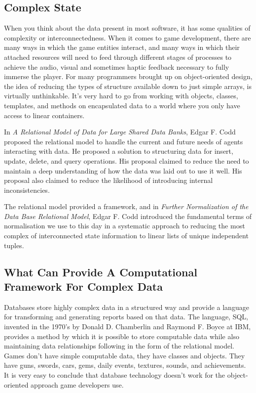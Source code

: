 \documentclass[a4paper,12pt]{book}
\begin{document}
\subsection{Complex State}

When you think about the data present in most software, it has some qualities of complexity or interconnectedness.
When it comes to game development, there are many ways in which the game entities interact, and many ways in which their attached resources will need to feed through different stages of processes to achieve the audio, visual and sometimes haptic feedback necessary to fully immerse the player.
For many programmers brought up on object-oriented design, the idea of reducing the types of structure available down to just simple arrays, is virtually unthinkable.
It's very hard to go from working with objects, classes, templates, and methods on encapsulated data to a world where you only have access to linear containers.

In \textit{A Relational Model of Data for Large Shared Data Banks}, Edgar F. Codd proposed the relational model to handle the current and future needs of agents interacting with data.
He proposed a solution to structuring data for insert, update, delete, and query operations.
His proposal claimed to reduce the need to maintain a deep understanding of how the data was laid out to use it well.
His proposal also claimed to reduce the likelihood of introducing internal inconsistencies.

The relational model provided a framework, and in \textit{Further Normalization of the Data Base Relational Model}, Edgar F. Codd introduced the fundamental terms of normalisation we use to this day in a systematic approach to reducing the most complex of interconnected state information to linear lists of unique independent tuples.

\subsection{What Can Provide A Computational Framework For Complex Data}

Databases store highly complex data in a structured way and provide a language for transforming and generating reports based on that data.
The language, SQL, invented in the 1970's by Donald D. Chamberlin and Raymond F. Boyce at IBM, provides a method by which it is possible to store computable data while also maintaining data relationships following in the form of the relational model.
Games don't have simple computable data, they have classes and objects.
They have guns, swords, cars, gems, daily events, textures, sounds, and achievements.
It is very easy to conclude that database technology doesn't work for the object-oriented approach game developers use.
\end{document}
